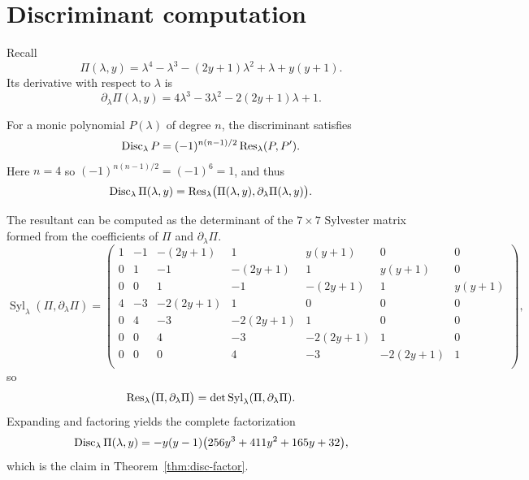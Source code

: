 \section{Discriminant computation}\label{app:disc}

Recall
\[
\Pi(\lambda,y)=\lambda^4-\lambda^3-(2y+1)\lambda^2+\lambda+y(y+1).
\]
Its derivative with respect to \(\lambda\) is
\[
\partial_\lambda \Pi(\lambda,y)=4\lambda^3-3\lambda^2-2(2y+1)\lambda+1.
\]

For a monic polynomial \(P(\lambda)\) of degree \(n\), the discriminant satisfies
\[
\operatorname{Disc}_\lambda P = (-1)^{n(n-1)/2}\operatorname{Res}_\lambda(P,P').
\]
Here \(n=4\) so \((-1)^{n(n-1)/2}=(-1)^6=1\), and thus
\[
\operatorname{Disc}_\lambda \Pi(\lambda,y)=\operatorname{Res}_\lambda\bigl(\Pi(\lambda,y),\partial_\lambda \Pi(\lambda,y)\bigr).
\]

The resultant can be computed as the determinant of the \(7\times 7\) Sylvester matrix formed from the coefficients of \(\Pi\) and \(\partial_\lambda\Pi\).
\[
\operatorname{Syl}_{\lambda}(\Pi,\partial_\lambda\Pi)=
\begin{pmatrix}
1&-1&-(2y+1)&1&y(y+1)&0&0\\
0&1&-1&-(2y+1)&1&y(y+1)&0\\
0&0&1&-1&-(2y+1)&1&y(y+1)\\
4&-3&-2(2y+1)&1&0&0&0\\
0&4&-3&-2(2y+1)&1&0&0\\
0&0&4&-3&-2(2y+1)&1&0\\
0&0&0&4&-3&-2(2y+1)&1\\
\end{pmatrix},
\]
so
\[
\operatorname{Res}_{\lambda}\bigl(\Pi,\partial_\lambda\Pi\bigr)
=\det\operatorname{Syl}_{\lambda}(\Pi,\partial_\lambda\Pi).
\]
Expanding and factoring yields the complete factorization
\[
\operatorname{Disc}_{\lambda}\Pi(\lambda,y)=-y(y-1)\bigl(256y^3+411y^2+165y+32\bigr),
\]
which is the claim in Theorem~\ref{thm:disc-factor}.

